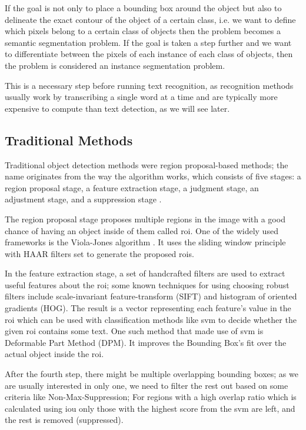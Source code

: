 If the goal is not only to place a bounding box around the object but also to delineate the exact contour of the object of a certain class, i.e. we want to define which pixels belong to a certain class of objects then the problem becomes a semantic segmentation problem. If the goal is taken a step further and we want to differentiate between the pixels of each instance of each class of objects, then the problem is considered an instance segmentation problem.

This is a necessary step before running text recognition, as recognition methods usually work by transcribing a single word at a time and are typically more expensive to compute than text detection, as we will see later.

\subsection{Traditional Methods}
Traditional object detection methods were region proposal-based methods; the name originates from the way the algorithm works, which consists of five stages: a region proposal stage, a feature extraction stage, a judgment stage, an adjustment stage, and a suppression stage \cite{wang_object_2021}.

The region proposal stage proposes multiple regions in the image with a good chance of having an object inside of them called \gls{roi}. One of the widely used frameworks is the Viola-Jones algorithm \cite{viola_rapid_2001}. It uses the sliding window principle with HAAR filters set to generate the proposed \gls{roi}s.

In the feature extraction stage, a set of handcrafted filters are used to extract useful features about the \gls{roi}; some known techniques for using choosing robust filters include scale-invariant feature-transform (SIFT) \cite{lowe_object_1999} and histogram of oriented gradients (HOG)\cite{dalal_histograms_2005}. The result is a vector representing each feature's value in the \gls{roi} which can be used with classification methods like \gls{svm} to decide whether the given \gls{roi} contains some text. One such method that made use of \gls{svm} is Deformable Part Method 
(DPM)\cite{felzenszwalb_object_nodate}. It improves the Bounding Box's fit over the actual object inside the \gls{roi}.

After the fourth step, there might be multiple overlapping bounding boxes; as we are usually interested in only one, we need to filter the rest out based on some criteria like Non-Max-Suppression; For regions with a high overlap ratio which is calculated using \gls{iou} only those with the highest score from the \gls{svm} are left, and the rest is removed (suppressed).

